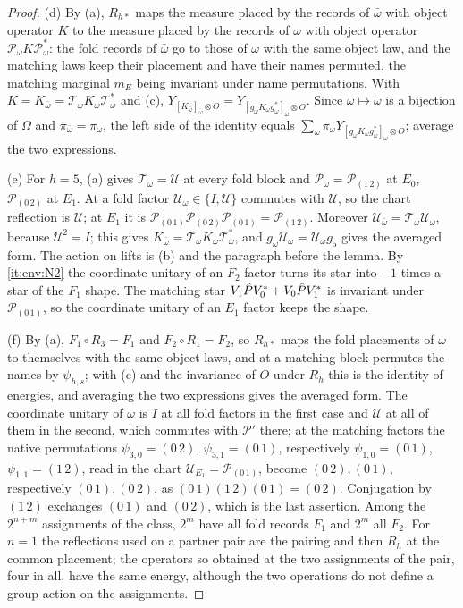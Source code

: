 \begin{proof}
(d) By (a), $R_{h*}$ maps the measure placed by the records of $\bar\omega$ with
object operator $K$ to the measure placed by the records of $\omega$ with object
operator $\mathcal P_\omega K\mathcal P_\omega^*$: the fold records of $\bar\omega$
go to those of $\omega$ with the same object law, and the matching laws keep
their placement and have their names permuted, the matching marginal $m_E$
being invariant under name permutations. With
$K=K_{\bar\omega}=\mathcal T_\omega K_\omega\mathcal T_\omega^*$ and (c),
$Y_{[K_{\bar\omega}]_{\bar\omega}\otimes O}=Y_{[g_\omega K_\omega g_\omega^*]_\omega\otimes O}$.
Since $\omega\mapsto\bar\omega$ is a bijection of $\Omega$ and
$\pi_{\bar\omega}=\pi_\omega$, the left side of the identity equals
$\sum_\omega\pi_\omega Y_{[g_\omega K_\omega g_\omega^*]_\omega\otimes O}$; average the two
expressions.

(e) For $h=5$, (a) gives $\mathcal T_\omega=\mathcal U$ at every fold block and
$\mathcal P_\omega=\mathcal P_{(1\,2)}$ at $E_0$, $\mathcal P_{(0\,2)}$ at $E_1$. At a
fold factor $\mathcal U_\omega\in\{I,\mathcal U\}$ commutes with $\mathcal U$, so the
chart reflection is $\mathcal U$; at $E_1$ it is
$\mathcal P_{(0\,1)}\mathcal P_{(0\,2)}\mathcal P_{(0\,1)}=\mathcal P_{(1\,2)}$. Moreover
$\mathcal U_{\bar\omega}=\mathcal T_\omega\mathcal U_\omega$, because $\mathcal U^2=I$;
this gives $K_{\bar\omega}=\mathcal T_\omega K_\omega\mathcal T_\omega^*$, and
$g_\omega\mathcal U_\omega=\mathcal U_\omega g_5$ gives the averaged form. The action on lifts is
(b) and the paragraph before the lemma. By \ref{it:env:N2} the coordinate unitary of an $F_2$
factor turns its star into $-1$ times a star of the $F_1$ shape. The matching star
$V_1\hat P V_0^*+V_0\hat P V_1^*$ is invariant under $\mathcal P_{(0\,1)}$, so the coordinate unitary of an $E_1$ factor keeps the shape.

(f) By (a), $F_1\circ R_3=F_1$ and $F_2\circ R_1=F_2$, so $R_{h*}$ maps the fold
placements of $\omega$ to themselves with the same object laws, and at a matching
block permutes the names by $\psi_{h,s}$; with (c) and the invariance of $O$ under
$R_h$ this is the identity of energies, and averaging the two expressions gives the
averaged form. The coordinate unitary of $\omega$ is $I$ at all fold factors in the first case and
$\mathcal U$ at all of them in the second, which commutes with $\mathcal P'$ there; at the
matching factors the native permutations $\psi_{3,0}=(0\,2)$, $\psi_{3,1}=(0\,1)$,
respectively $\psi_{1,0}=(0\,1)$, $\psi_{1,1}=(1\,2)$, read in the chart
$\mathcal U_{E_1}=\mathcal P_{(0\,1)}$, become $(0\,2),(0\,1)$, respectively $(0\,1),(0\,2)$, as
$(0\,1)(1\,2)(0\,1)=(0\,2)$. Conjugation by $(1\,2)$ exchanges $(0\,1)$ and $(0\,2)$,
which is the last assertion. Among the $2^{n+m}$ assignments of the class, $2^m$
have all fold records $F_1$ and $2^m$ all $F_2$. For $n=1$ the reflections used on a
partner pair are the pairing and then $R_h$ at the common placement; the operators so obtained at the two assignments of the pair, four in all, have the same energy, although the two operations do not define a group action on the assignments.


\end{proof}
